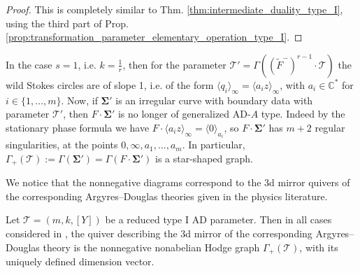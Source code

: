 \documentclass[11pt,a4paper]{amsart}
\numberwithin{equation}{section}
\newcommand{\cir}[1]{\langle #1 \rangle}
\begin{document}
\begin{proof}
This is completely similar to Thm. \ref{thm:intermediate_duality_type_I}, using the third part of Prop. \ref{prop:transformation_parameter_elementary_operation_type_I}.
\end{proof}

\begin{remark}
\label{remark:case_irregularity_1}
In the case $s=1$, i.e. $k=\frac{1}{r}$, then for the parameter $\mathcal T'=\Gamma((\widetilde{F}^-)^{r-1}\cdot \mathcal T)$ the wild Stokes circles are of slope 1, i.e. of the form $\cir{q_i}_\infty=\cir{a_i z}_\infty$, with $a_i\in \mathbb C^*$ for $i\in \{1, \dots, m\}$. Now, if $\bm\Sigma'$ is an irregular curve with boundary data with parameter $\mathcal T'$, then $F\cdot \bm\Sigma'$ is no longer of generalized AD-$A$ type. Indeed by the stationary phase formula we have $F\cdot \cir{a_i z}_\infty=\cir{0}_{a_i}$, so $F\cdot \bm\Sigma'$ has $m+2$ regular singularities, at the points $0,\infty, a_1, \dots, a_m$. In particular, $\Gamma_+(\mathcal T):=\Gamma(\bm\Sigma')=\Gamma(F\cdot\bm\Sigma')$ is a star-shaped graph. 
\end{remark}

We notice that the nonnegative diagrams correspond to the 3d mirror quivers of the corresponding Argyres--Douglas theories given in the physics literature.

\begin{proposition} 
\label{prop:3d_mirrors_are_nonneg_diagrams_type_I}
Let $\mathscr T=(m,k, [Y])$ be a reduced type I AD parameter. Then in all cases considered in \cite{beem2025simplifying}, the quiver describing the 3d mirror of the corresponding Argyres--Douglas theory is the nonnegative nonabelian Hodge graph $\Gamma_+(\mathscr T)$, with its uniquely defined dimension vector. 
\end{proposition}
\end{document}
